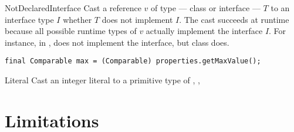 












\begin{pattern}{NotDeclaredInterface}
Cast a reference $v$ of type --- class or interface --- $T$ to an
interface type $I$ whether $T$ does not implement $I$.
The cast succeeds at runtime because all possible runtime types of $v$
actually implement the interface $I$.
For instance, in ,  does not
implement the  interface, but class  does.

\instances

\begin{lstlisting}[style=java,caption=From \url{http://bit.ly/2FQOt4v}]
final Comparable max = (Comparable) properties.getMaxValue();
\end{lstlisting}
\end{pattern}

\begin{pattern}{Literal}
Cast an integer literal to a primitive type of
, , 
\end{pattern}

\section{Limitations}